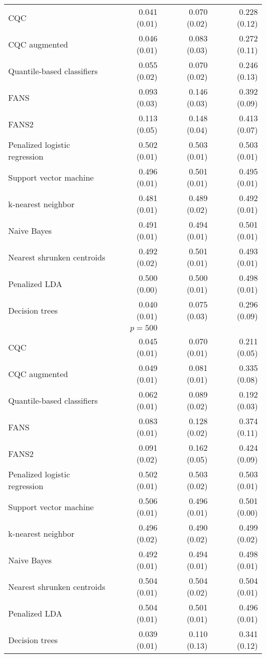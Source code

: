 \begin{table}[p]
\begin{adjustbox}{max size={\textwidth}{10cm}}
\begin{tabular}{l@{\extracolsep{15mm}}rrr}
      CQC & 0.041 (0.01) & 0.070 (0.02) & 0.228 (0.12) \\ 
      CQC augmented & 0.046 (0.01) & 0.083 (0.03) & 0.272 (0.11) \\ 
      Quantile-based classifiers & 0.055 (0.02) & 0.070 (0.02) & 0.246 (0.13) \\ 
      FANS  & 0.093 (0.03) & 0.146 (0.03) & 0.392 (0.09) \\
      FANS2 & 0.113 (0.05) & 0.148 (0.04) & 0.413 (0.07) \\
      Penalized logistic regression & 0.502 (0.01) & 0.503 (0.01) & 0.503 (0.01) \\ 
      Support vector machine & 0.496 (0.01) & 0.501 (0.01) & 0.495 (0.01) \\ 
      k-nearest neighbor & 0.481 (0.01) & 0.489 (0.02) & 0.492 (0.01) \\ 
      Naive Bayes & 0.491 (0.01) & 0.494 (0.01) & 0.501 (0.01) \\ 
      Nearest shrunken centroids & 0.492 (0.02) & 0.501 (0.01) & 0.493 (0.01) \\ 
      Penalized LDA & 0.500 (0.00) & 0.500 (0.01) & 0.498 (0.01) \\ 
      Decision trees & 0.040 (0.01) & 0.075 (0.03) & 0.296 (0.09) \\ [2ex]

      \hline
      & $p = 500$ \\
      \hline

      CQC & 0.045 (0.01) & 0.070 (0.01) & 0.211 (0.05) \\ 
      CQC augmented & 0.049 (0.01) & 0.081 (0.01) & 0.335 (0.08) \\ 
      Quantile-based classifiers & 0.062 (0.01) & 0.089 (0.02) & 0.192 (0.03) \\ 
      FANS  & 0.083 (0.01) & 0.128 (0.02) & 0.374 (0.11) \\
      FANS2 & 0.091 (0.02) & 0.162 (0.05) & 0.424 (0.09) \\
      Penalized logistic regression & 0.502 (0.01) & 0.503 (0.02) & 0.503 (0.01) \\ 
      Support vector machine & 0.506 (0.01) & 0.496 (0.01) & 0.501 (0.00) \\ 
      k-nearest neighbor & 0.496 (0.02) & 0.490 (0.02) & 0.499 (0.02) \\ 
      Naive Bayes & 0.492 (0.01) & 0.494 (0.01) & 0.498 (0.01) \\ 
      Nearest shrunken centroids & 0.504 (0.01) & 0.504 (0.02) & 0.504 (0.01) \\ 
      Penalized LDA & 0.504 (0.01) & 0.501 (0.01) & 0.496 (0.01) \\ 
      Decision trees & 0.039 (0.01) & 0.110 (0.13) & 0.341 (0.12) \\ 

      \hline
      
    \end{tabular}
  \end{adjustbox}
\end{table}




